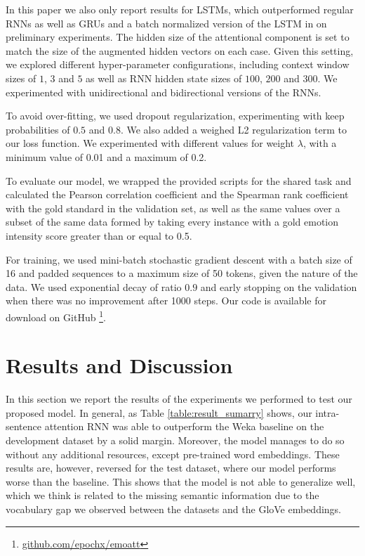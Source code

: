 \documentclass[11pt,letterpaper]{article}
\begin{document}
In this paper we also only report results for LSTMs, which outperformed regular RNNs as well as GRUs and a batch normalized version of the LSTM in on preliminary experiments. The hidden size of the attentional component is set to match the size of the augmented hidden vectors on each case. Given this setting, we explored different hyper-parameter configurations, including context window sizes of $1$, $3$ and $5$ as well as RNN hidden state sizes of $100$, $200$ and $300$. We experimented with unidirectional and bidirectional versions of the RNNs.

To avoid over-fitting, we used dropout regularization, experimenting with keep probabilities of $0.5$ and $0.8$. We also added a weighed L2 regularization term to our loss function. We experimented with different values for weight $\lambda$, with a minimum value of 0.01 and a maximum of 0.2.

To evaluate our model, we wrapped the provided scripts for the shared task and calculated the Pearson correlation coefficient and the Spearman rank coefficient with the gold standard in the validation set, as well as the same values over a subset of the same data formed by taking every instance with a gold emotion intensity score greater than or equal to 0.5.

For training, we used mini-batch stochastic gradient descent with a batch size of 16 and padded sequences to a maximum size of 50 tokens, given the nature of the data. We used exponential decay of ratio $0.9$ and early stopping on the validation when there was no improvement after 1000 steps. Our code is available for download on GitHub \footnote{\url{github.com/epochx/emoatt}}.



\section{Results and Discussion}

In this section we report the results of the experiments we performed to test our proposed model. In general, as Table \ref{table:result_sumarry} shows, our intra-sentence attention RNN was able to outperform the Weka baseline \cite{mohammadB17starsem} on the development dataset by a solid margin. Moreover, the model manages to do so without any additional resources, except pre-trained word embeddings. These results are, however, reversed for the test dataset, where our model performs worse than the baseline. This shows that the model is not able to generalize well, which we think is related to the missing semantic information due to the vocabulary gap we observed between the datasets and the GloVe embeddings.
\end{document}
